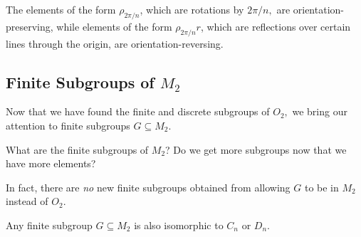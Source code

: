 The elements of the form $\rho_{2\pi/n}$, which are rotations by $2\pi/n,$ are orientation-preserving, while elements of the form $\rho_{2\pi / n}r$, which are reflections over certain lines through the origin, are orientation-reversing.


\subsection{Finite Subgroups of \texorpdfstring{$M_2$}{M2}}

Now that we have found the finite and discrete subgroups of $O_2,$ we bring our attention to finite subgroups $G \subseteq M_2.$
\begin{qq}
What are the finite subgroups of $M_2$? Do we get more subgroups now that we have more elements?
\end{qq}

In fact, there are \emph{no} new finite subgroups obtained from allowing $G$ to be in $M_2$ instead of $O_2.$ 

\begin{theorem}
Any finite subgroup $G \subseteq M_2$ is also isomorphic to $C_n$ or $D_n.$
\end{theorem}

